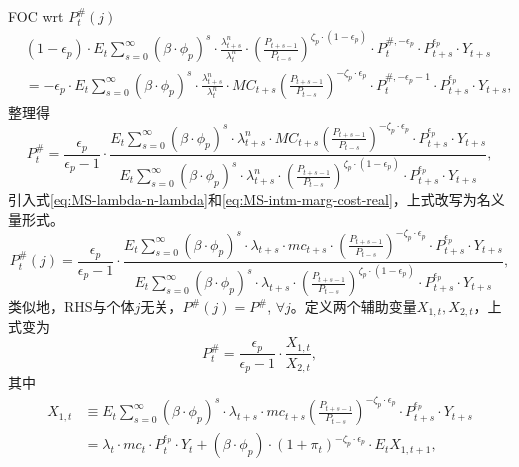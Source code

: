FOC wrt $P^{\#}_t(j)$
\begin{equation*}
\begin{split}
&\left(1-\epsilon_p \right) \cdot E_t \sum_{s=0}^{\infty}  \left(\beta \cdot \phi_p \right)^s \cdot \frac{\lambda^n_{t+s}}{\lambda^n_{t}} \cdot \left(\frac{P_{t+s-1}}{P_{t-s}}\right)^{\zeta_p \cdot \left(1-\epsilon_p \right)} \cdot P_t^{\#, -\epsilon_p} \cdot P_{t+s}^{\epsilon_p} \cdot Y_{t+s}\\
&= -\epsilon_p \cdot E_t \sum_{s=0}^{\infty}  \left(\beta \cdot \phi_p \right)^s \cdot \frac{\lambda^n_{t+s}}{\lambda^n_{t}} \cdot MC_{t+s} \left(\frac{P_{t+s-1}}{P_{t-s}}\right)^{ - \zeta_p \cdot \epsilon_p } \cdot P_t^{\#, -\epsilon_p - 1} \cdot P_{t+s}^{\epsilon_p} \cdot Y_{t+s},
\end{split}
\end{equation*}
整理得
\begin{equation*}
P_t^{\#} = \frac{\epsilon_p}{\epsilon_p -1} \cdot \frac{
  E_t \sum_{s=0}^{\infty}  \left(\beta \cdot \phi_p \right)^s \cdot \lambda^n_{t+s} \cdot MC_{t+s} \left(\frac{P_{t+s-1}}{P_{t-s}}\right)^{ - \zeta_p \cdot \epsilon_p } \cdot P_{t+s}^{\epsilon_p} \cdot Y_{t+s}
}{
  E_t \sum_{s=0}^{\infty}  \left(\beta \cdot \phi_p \right)^s \cdot \lambda^n_{t+s} \cdot \left(\frac{P_{t+s-1}}{P_{t-s}}\right)^{\zeta_p \cdot \left(1-\epsilon_p \right)} \cdot P_{t+s}^{\epsilon_p} \cdot Y_{t+s}
},
\end{equation*}
引入式\eqref{eq:MS-lambda-n-lambda}和\eqref{eq:MS-intm-marg-cost-real}，上式改写为名义量形式。
\begin{equation}
\label{eq:MS-intm-price-sharp}
P_t^{\#}(j) = \frac{\epsilon_p}{\epsilon_p -1} \cdot \frac{
  E_t \sum_{s=0}^{\infty}  \left(\beta \cdot \phi_p \right)^s \cdot \lambda_{t+s} \cdot mc_{t+s} \cdot \left(\frac{P_{t+s-1}}{P_{t-s}}\right)^{ - \zeta_p \cdot \epsilon_p } \cdot P_{t+s}^{\epsilon_p} \cdot Y_{t+s}
}{
  E_t \sum_{s=0}^{\infty}  \left(\beta \cdot \phi_p \right)^s \cdot \lambda_{t+s} \cdot \left(\frac{P_{t+s-1}}{P_{t-s}}\right)^{\zeta_p \cdot \left(1-\epsilon_p \right)} \cdot P_{t+s}^{\epsilon_p} \cdot Y_{t+s}
},
\end{equation}
类似地，RHS与个体$j$无关，$P^{\#}(j) = P^{\#}$, $\forall j$。定义两个辅助变量$X_{1,t},X_{2,t}$，上式变为
\begin{equation}
\label{eq:MS-intm-price-sharp-auxiliary}
P_{t}^{\#} = \frac{\epsilon_p}{\epsilon_{p} - 1} \cdot \frac{X_{1,t}}{X_{2,t}},
\end{equation}
其中
\begin{equation}
\label{eq:MS-intm-auxiliary-X1}
\begin{split}
X_{1,t} &\equiv E_t \sum_{s=0}^{\infty}  \left(\beta \cdot \phi_p \right)^s \cdot \lambda_{t+s} \cdot mc_{t+s} \left(\frac{P_{t+s-1}}{P_{t-s}}\right)^{ - \zeta_p \cdot \epsilon_p } \cdot P_{t+s}^{\epsilon_p} \cdot Y_{t+s} \\
&= \lambda_t \cdot mc_t \cdot P_t^{\epsilon_p} \cdot Y_t + \left(\beta \cdot \phi_p \right) \cdot \left(1 + \pi_t\right)^{-\zeta_p \cdot \epsilon_p} \cdot E_t X_{1,t+1},
\end{split}
\end{equation}
